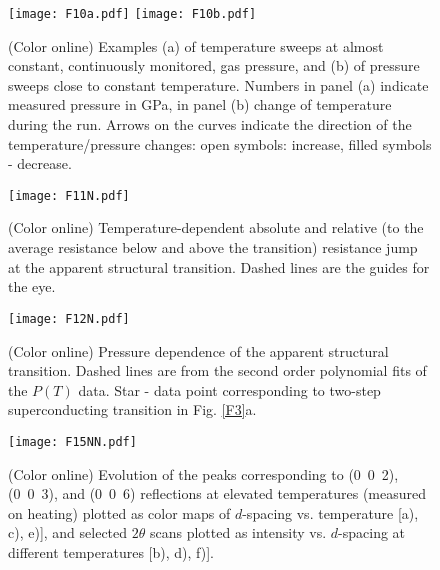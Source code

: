 \documentclass[aps,prb,preprint,groupedaddress,showpacs,amsmath,amssymb]{revtex4}
\begin{document}
\clearpage

\begin{figure}
\begin{center}
\texttt{[image: F10a.pdf]}
\texttt{[image: F10b.pdf]}
\end{center}
\caption{(Color online) Examples (a) of  temperature sweeps at almost constant, continuously monitored, gas pressure, and (b) of pressure sweeps close to constant temperature. Numbers in panel (a) indicate measured pressure in GPa, in panel (b) change of temperature during the run. Arrows on the curves indicate the direction of the temperature/pressure changes: open symbols: increase, filled symbols - decrease. } \label{F10}
\end{figure}

\clearpage

\begin{figure}
\begin{center}
\texttt{[image: F11N.pdf]}
\end{center}
\caption{(Color online) Temperature-dependent absolute and relative (to the average resistance below and above the transition) resistance jump at the apparent structural transition. Dashed lines are the guides for the eye.} \label{F11}
\end{figure}

\clearpage

\begin{figure}
\begin{center}
\texttt{[image: F12N.pdf]}
\end{center}
\caption{(Color online) Pressure dependence of the apparent structural transition. Dashed lines are from the second order polynomial fits of the $P(T)$ data. Star - data point corresponding to two-step superconducting transition in Fig. \ref{F3}a.} \label{F12}
\end{figure}

\clearpage

\begin{figure}
\begin{center}
\texttt{[image: F15NN.pdf]}
\end{center}
\caption{(Color online) Evolution of the peaks corresponding to (0~0~2), (0~0~3), and (0~0~6) reflections at elevated temperatures (measured on heating) plotted as color maps of $d$-spacing vs. temperature [a), c), e)], and selected $2 \theta$ scans plotted as intensity vs. $d$-spacing  at different temperatures [b), d), f)].} \label{F15}
\end{figure}
\clearpage
\end{document}
